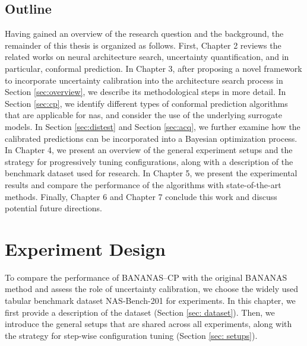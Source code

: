 \documentclass[a4paper,oneside,bibliography=totoc]{scrbook}
\begin{document}
\section{Outline}
Having gained an overview of the research question and the background, the remainder of this thesis is organized as follows. First, Chapter 2 reviews the related works on neural architecture search, uncertainty quantification, and in particular, conformal prediction. In Chapter 3, after proposing a novel framework to incorporate uncertainty calibration into the architecture search process in Section \ref{sec:overview}, we describe its methodological steps in more detail. In Section \ref{sec:cp}, we identify different types of conformal prediction algorithms that are applicable for \gls{nas}, and consider the use of the underlying surrogate models. In Section \ref{sec:distest} and Section \ref{sec:acq}, we further examine how the calibrated predictions can be incorporated into a Bayesian optimization process. In Chapter 4, we present an overview of the general experiment setups and the strategy for progressively tuning configurations, along with a description of the benchmark dataset used for research. In Chapter 5, we present the experimental results and compare the performance of the algorithms with state-of-the-art methods. Finally, Chapter 6 and Chapter 7 conclude this work and discuss potential future directions.





\chapter{Experiment Design}
\label{ch4}
To compare the performance of BANANAS--CP with the original BANANAS method and assess the role of uncertainty calibration, we choose the widely used tabular benchmark dataset NAS-Bench-201 \cite{dong2020nasbench201} for experiments. In this chapter, we first provide a description of the dataset (Section \ref{sec: dataset}). Then, we introduce the general setups that are shared across all experiments, along with the strategy for step-wise configuration tuning  (Section \ref{sec: setups}).
\end{document}
